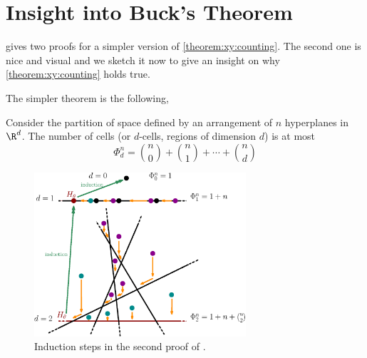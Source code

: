 \section{Insight into Buck's Theorem}

\citet*{matousek:2002} gives two proofs for a simpler version of
\ref{theorem:xy:counting}. The second one is nice and visual and we
sketch it now to give an insight on why \ref{theorem:xy:counting} holds
true.

The simpler theorem is the following,

\begin{theorem}
Consider the partition of space defined by an arrangement of \(n\) hyperplanes
in \(\R^d\). The number of cells (or \(d\)-cells, regions of dimension \(d\))
is at most
\begin{displaymath}
\Phi_d^n = \binom{n}{0} + \binom{n}{1} + \cdots + \binom{n}{d}
\end{displaymath}
\end{theorem}

\begin{figure}
\centering
\includegraphics[width=0.7\textwidth]{fig/x+y/buck/arrangement}
\caption{Induction steps in the second proof of \citet*{matousek:2002}.}
\label{fig:xy:buck:arrangement}
\end{figure}

